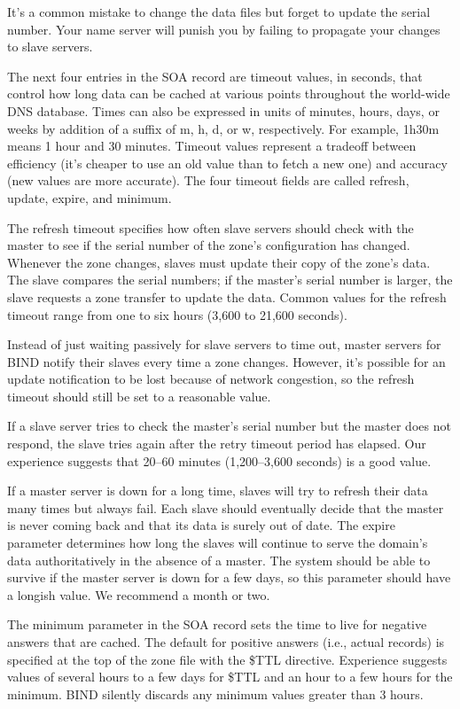 It's a common mistake to change the data files but forget to update the
serial number. Your name server will punish you by failing to propagate
your changes to slave servers.

The next four entries in the SOA record are timeout values, in seconds,
that control how long data can be cached at various points throughout
the world-wide DNS database. Times can also be expressed in units of
minutes, hours, days, or weeks by addition of a suffix of {m}, {h}, {d},
or {w}, respectively. For example, {1h30m} means 1 hour and 30 minutes.
Timeout values represent a tradeoff between efficiency (it's cheaper to
use an old value than to fetch a new one) and accuracy (new values are
more accurate). The four timeout fields are called {refresh}, {update},
{expire}, and {minimum}.

The {refresh} timeout specifies how often slave servers should check
with the master to see if the serial number of the zone's configuration
has changed. Whenever the zone changes, slaves must update their copy of
the zone's data. The slave compares the serial numbers; if the master's
serial number is larger, the slave requests a zone transfer to update
the data. Common values for the {refresh} timeout range from one to six
hours (3,600 to 21,600 seconds).

Instead of just waiting passively for slave servers to time out, master
servers for BIND notify their slaves every time a zone changes. However,
it's possible for an update notification to be lost because of network
congestion, so the refresh timeout should still be set to a reasonable
value.

If a slave server tries to check the master's serial number but the
master does not respond, the slave tries again after the {retry} timeout
period has elapsed. Our experience suggests that 20--60 minutes
(1,200--3,600 seconds) is a good value.

If a master server is down for a long time, slaves will try to refresh
their data many times but always fail. Each slave should eventually
decide that the master is never coming back and that its data is surely
out of date. The {expire} parameter determines how long the slaves will
continue to serve the domain's data authoritatively in the absence of a
master. The system should be able to survive if the master server is
down for a few days, so this parameter should have a longish value. We
recommend a month or two.

The {minimum} parameter in the SOA record sets the time to live for
negative answers that are cached. The default for positive answers
(i.e., actual records) is specified at the top of the zone file with the
{\$TTL} directive. Experience suggests values of several hours to a few
days for {\$TTL} and an hour to a few hours for the {minimum}. BIND
silently discards any {minimum} values greater than 3 hours.

